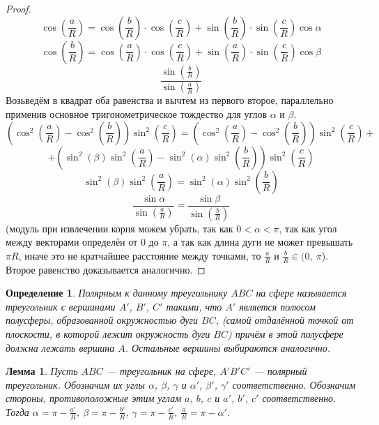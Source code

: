 \documentclass[12pt]{article}
\theoremstyle{plain}
\newtheorem{lemma}{Лемма}[section]
\newtheorem{definition}{Определение}[section]
\begin{document}
    \begin{proof}
        $$\cos\left(\frac{a}{R}\right)=\cos\left(\frac{b}{R}\right)\cdot\cos\left(\frac{c}{R}\right)+\sin\left(\frac{b}{R}\right)\cdot\sin\left(\frac{c}{R}\right)\cos\alpha$$
        $$\cos\left(\frac{b}{R}\right)=\cos\left(\frac{a}{R}\right)\cdot\cos\left(\frac{c}{R}\right)+\sin\left(\frac{a}{R}\right)\cdot\sin\left(\frac{c}{R}\right)\cos\beta$$
        $$\frac{\sin\left(\frac{b}{R}\right)}{\sin\left(\frac{a}{R}\right)}$$
        Возьведём в квадрат оба равенства и вычтем из первого второе, параллельно применив основное тригонометрическое тождество для углов $\alpha$ и $\beta$.
        $$\left(\cos^2\left(\frac{a}{R}\right)-\cos^2\left(\frac{b}{R}\right)\right)\sin^2\left(\frac{c}{R}\right)=\left(\cos^2\left(\frac{a}{R}\right)-\cos^2\left(\frac{b}{R}\right)\right)\sin^2\left(\frac{c}{R}\right)+$$
        $$+\left(\sin^2(\beta)\sin^2\left(\frac{a}{R}\right)-\sin^2(\alpha)\sin^2\left(\frac{b}{R}\right)\right)\sin^2\left(\frac{c}{R}\right)$$
        $$\sin^2(\beta)\sin^2\left(\frac{a}{R}\right)=\sin^2(\alpha)\sin^2\left(\frac{b}{R}\right)$$
        $$\frac{\sin\alpha}{\sin\left(\frac{a}{R}\right)}=\frac{\sin\beta}{\sin\left(\frac{b}{R}\right)}$$
        (модуль при извлечении корня можем убрать, так как $0<\alpha<\pi$, так как угол между векторами определён от $0$ до $\pi$, а так как длина дуги не может превышать $\pi R$, иначе это не кратчайшее расстояние между точками, то $\frac{a}{R}$ и $\frac{b}{R}\in(0, \ \pi$). Второе равенство доказывается аналогично.
    \end{proof}
    \begin{definition}
        Полярным к данному треугольнику $ABC$ на сфере называется треугольник с вершинами $A'$, $B'$, $C'$ такими, что $A'$ является полюсом полусферы, образованной окружностью дуги $BC$, (самой отдалённой точкой от плоскости, в которой лежит окружность дуги $BC$) причём в этой полусфере должна лежать вершина $A$. Остальные вершины выбираются аналогично.
    \end{definition}
    \begin{lemma}
        Пусть $ABC$ --- треугольник на сфере, $A'B'C'$ --- полярный треугольник. Обозначим их углы $\alpha$, $\beta$, $\gamma$ и $\alpha'$, $\beta'$, $\gamma'$ соответственно. Обозначим стороны, противоположные этим углам $a$, $b$, $c$ и $a'$, $b'$, $c'$ соответственно. Тогда $\alpha=\pi-\frac{a'}{R}$, $\beta=\pi-\frac{b'}{R}$, $\gamma=\pi-\frac{c'}{R}$, $\frac{a}{R}=\pi-\alpha'$.
    \end{lemma}
\end{document}
